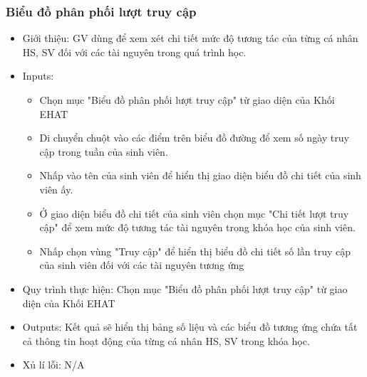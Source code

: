 \subsubsection{Biểu đồ phân phối lượt truy cập}
\begin{itemize}
	\item Giới thiệu: GV dùng để xem xét chi tiết mức độ tương tác của từng cá nhân HS, SV đối với các tài nguyên trong quá trình học.
	\item Inputs: 
	\begin{itemize}
		\item Chọn mục "Biểu đồ phân phối lượt truy cập" từ giao diện của Khối EHAT
		\item Di chuyển chuột vào các điểm trên biểu đồ đường để xem số ngày truy cập trong tuần của sinh viên.
		\item Nhấp vào tên của sinh viên để hiển thị giao diện biểu đồ chi tiết của sinh viên ấy.
		\item Ở giao diện biểu đồ chi tiết của sinh viên chọn mục "Chi tiết lượt truy cập" để xem mức độ tương tác tài nguyên trong khóa học của sinh viên.
		\item Nhấp chọn vùng "Truy cập" để hiển thị biểu đồ chi tiết số lần truy cập của sinh viên đối với các tài nguyên tương ứng
	\end{itemize}
	\item Quy trình thực hiện: Chọn mục "Biểu đồ phân phối lượt truy cập" từ giao diện của Khối EHAT
	\item Outputs: Kết quả sẽ hiển thị bảng số liệu và các biểu đồ tương ứng chứa tất cả thông tin hoạt động của từng cá nhân HS, SV trong khóa học.
	\item Xủ lí lỗi: N/A
\end{itemize}

